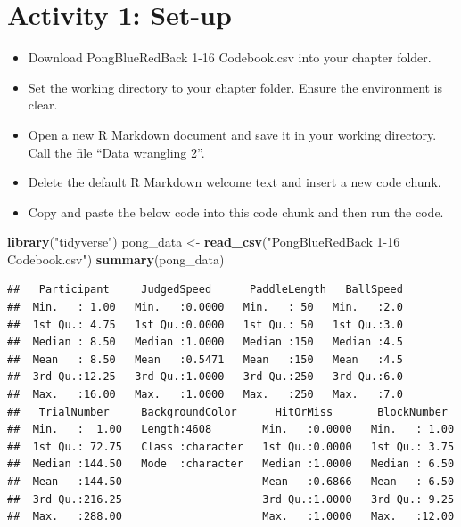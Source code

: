 \documentclass[]{book}
\newenvironment{Shaded}{\begin{snugshade}}{\end{snugshade}}
\newcommand{\KeywordTok}[1]{\textcolor[rgb]{0.13,0.29,0.53}{\textbf{#1}}}
\newcommand{\NormalTok}[1]{#1}
\newcommand{\StringTok}[1]{\textcolor[rgb]{0.31,0.60,0.02}{#1}}
\providecommand{\tightlist}{%
  \setlength{\itemsep}{0pt}\setlength{\parskip}{0pt}}
\begin{document}
\hypertarget{activity-1-set-up-2}{%
\section{Activity 1: Set-up}\label{activity-1-set-up-2}}

\begin{itemize}
\tightlist
\item
  Download PongBlueRedBack 1-16 Codebook.csv into your chapter folder.\\
\item
  Set the working directory to your chapter folder. Ensure the environment is clear.\\
\item
  Open a new R Markdown document and save it in your working directory. Call the file ``Data wrangling 2''.\\
\item
  Delete the default R Markdown welcome text and insert a new code chunk.
\item
  Copy and paste the below code into this code chunk and then run the code.
\end{itemize}

\begin{Shaded}
\begin{Highlighting}[]
\KeywordTok{library}\NormalTok{(}\StringTok{"tidyverse"}\NormalTok{)}
\NormalTok{pong_data <-}\StringTok{ }\KeywordTok{read_csv}\NormalTok{(}\StringTok{"PongBlueRedBack 1-16 Codebook.csv"}\NormalTok{)}
\KeywordTok{summary}\NormalTok{(pong_data)}
\end{Highlighting}
\end{Shaded}

\begin{verbatim}
##   Participant     JudgedSpeed      PaddleLength   BallSpeed  
##  Min.   : 1.00   Min.   :0.0000   Min.   : 50   Min.   :2.0  
##  1st Qu.: 4.75   1st Qu.:0.0000   1st Qu.: 50   1st Qu.:3.0  
##  Median : 8.50   Median :1.0000   Median :150   Median :4.5  
##  Mean   : 8.50   Mean   :0.5471   Mean   :150   Mean   :4.5  
##  3rd Qu.:12.25   3rd Qu.:1.0000   3rd Qu.:250   3rd Qu.:6.0  
##  Max.   :16.00   Max.   :1.0000   Max.   :250   Max.   :7.0  
##   TrialNumber     BackgroundColor      HitOrMiss       BlockNumber   
##  Min.   :  1.00   Length:4608        Min.   :0.0000   Min.   : 1.00  
##  1st Qu.: 72.75   Class :character   1st Qu.:0.0000   1st Qu.: 3.75  
##  Median :144.50   Mode  :character   Median :1.0000   Median : 6.50  
##  Mean   :144.50                      Mean   :0.6866   Mean   : 6.50  
##  3rd Qu.:216.25                      3rd Qu.:1.0000   3rd Qu.: 9.25  
##  Max.   :288.00                      Max.   :1.0000   Max.   :12.00
\end{verbatim}
\end{document}
